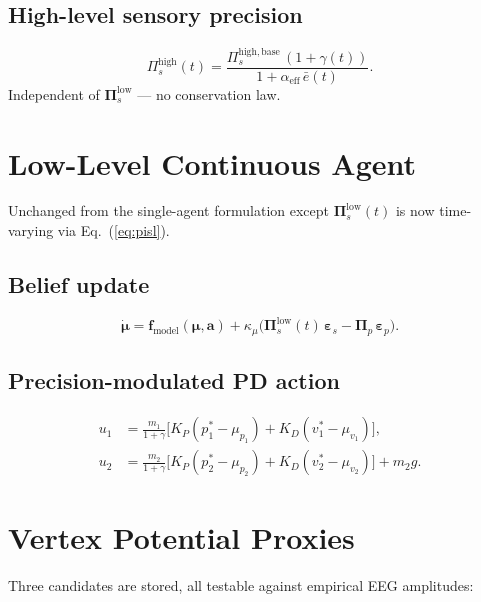 \documentclass[11pt, a4paper]{article}
\newcommand{\vect}[1]{\bm{#1}}
\newcommand{\mat}[1]{\mathbf{#1}}
\newcommand{\Pip}{\mat{\Pi}_p}
\newcommand{\Pisl}{\mat{\Pi}_s^{\mathrm{low}}}
\newcommand{\Pish}{\Pi_s^{\mathrm{high}}}
\newcommand{\epsp}{\vect{\varepsilon}_p}
\newcommand{\epss}{\vect{\varepsilon}_s}
\begin{document}
\subsection{High-level sensory precision}
\begin{equation}
  \Pish(t) = \frac{\Pi_s^{\mathrm{high,base}}\,(1+\gamma(t))}
                  {1 + \alpha_{\mathrm{eff}}\,\bar{e}(t)}.
  \label{eq:pish}
\end{equation}
Independent of $\Pisl$ — no conservation law.

\section{Low-Level Continuous Agent}

Unchanged from the single-agent formulation except $\Pisl(t)$ is now
time-varying via Eq.~(\ref{eq:pisl}).

\subsection{Belief update}
\begin{equation}
  \dot{\vect{\mu}} = \vect{f}_{\mathrm{model}}(\vect{\mu}, \vect{a})
    + \kappa_\mu\bigl(\Pisl(t)\,\epss - \Pip\,\epsp\bigr).
\end{equation}

\subsection{Precision-modulated PD action}
\begin{align}
  u_1 &= \frac{m_1}{1+\gamma}\bigl[K_P(p_1^* - \mu_{p_1})
         + K_D(v_1^* - \mu_{v_1})\bigr], \\
  u_2 &= \frac{m_2}{1+\gamma}\bigl[K_P(p_2^* - \mu_{p_2})
         + K_D(v_2^* - \mu_{v_2})\bigr] + m_2 g.
\end{align}

\section{Vertex Potential Proxies}
\label{sec:vp}

Three candidates are stored, all testable against empirical EEG amplitudes:
\end{document}
